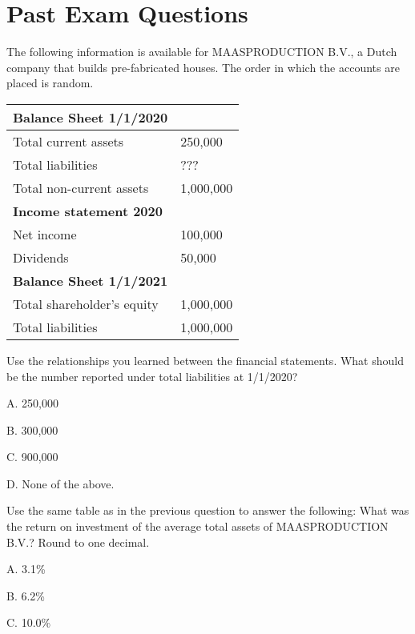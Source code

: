 \documentclass{scrartcl}
\begin{document}
\newpage

\section{Past Exam Questions}

The following information is available for MAASPRODUCTION B.V., 
a Dutch company that builds pre-fabricated houses.
The order in which the accounts are placed is random.

\begin{center}
    \begin{tabular}{|l|l|} \hline
        \textbf{Balance Sheet 1/1/2020} & \\ \hline
        Total current assets & 250,000 \\ \hline
        Total liabilities & ??? \\ \hline
        Total non-current assets & 1,000,000 \\ \hline
        \textbf{Income statement 2020} & \\ \hline
        Net income & 100,000 \\ \hline
        Dividends & 50,000 \\ \hline
        \textbf{Balance Sheet 1/1/2021} & \\ \hline
        Total shareholder's equity & 1,000,000 \\ \hline
        Total liabilities & 1,000,000 \\ \hline
    \end{tabular}
\end{center}

Use the relationships you learned between the financial statements.
What should be the number reported under total liabilities at 1/1/2020?

\bigskip

A. 250,000

B. 300,000

C. 900,000

D. None of the above.

\vspace{10em}

Use the same table as in the previous question to answer the following:
What was the return on investment of the average total assets of
MAASPRODUCTION B.V.? Round to one decimal.

\bigskip

A. 3.1\%

B. 6.2\%

C. 10.0\%
\end{document}
